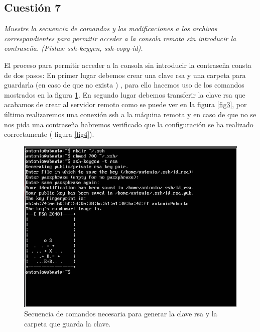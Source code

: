 \subsection{Cuestión 7}
\textit{Muestre la secuencia de comandos y las modificaciones a los archivos correspondientes para permitir acceder a la consola remota sin introducir la contraseña. (Pistas: ssh-keygen, ssh-copy-id).}
\newline

El proceso para permitir acceder a la consola sin introducir la contraseña consta de dos pasos: En primer lugar debemos crear una clave rsa y una carpeta para guardarla (en caso de que no exista ) , para ello hacemos uso de los comandos mostrados en la figura \ref{fig2}. En segundo lugar debemos transferir la clave rsa que acabamos de crear al servidor remoto como se puede ver en la figura \ref{fig3}, por último realizaremos una conexión ssh a la máquina remota y en caso de que no se nos pida una contraseña habremos verificado que la configuración se ha realizado correctamente ( figura \ref{fig4}). \cite{passssh}

\begin{figure}[H]
    \begin{center}
        \includegraphics[scale=0.45]{imagenes/img2}
        \caption{Secuencia de comandos necesaria para generar la clave rsa y la carpeta que guarda la clave.}
        \label{fig2}
    \end{center}
\end{figure}

